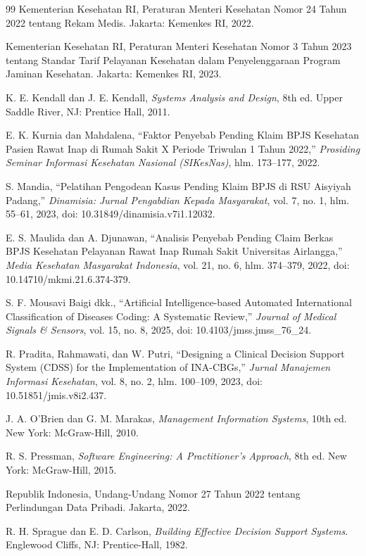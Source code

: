 \begin{thebibliography}{99}
  Kementerian Kesehatan RI, Peraturan Menteri Kesehatan Nomor 24 Tahun 2022 tentang Rekam Medis. Jakarta: Kemenkes RI, 2022.

  Kementerian Kesehatan RI, Peraturan Menteri Kesehatan Nomor 3 Tahun 2023 tentang Standar Tarif Pelayanan Kesehatan dalam Penyelenggaraan Program Jaminan Kesehatan. Jakarta: Kemenkes RI, 2023.

  K. E. Kendall dan J. E. Kendall, \textit{Systems Analysis and Design}, 8th ed. Upper Saddle River, NJ: Prentice Hall, 2011.

  E. K. Kurnia dan Mahdalena, ``Faktor Penyebab Pending Klaim BPJS Kesehatan Pasien Rawat Inap di Rumah Sakit X Periode Triwulan 1 Tahun 2022,'' \textit{Prosiding Seminar Informasi Kesehatan Nasional (SIKesNas)}, hlm. 173--177, 2022.

  S. Mandia, ``Pelatihan Pengodean Kasus Pending Klaim BPJS di RSU Aisyiyah Padang,'' \textit{Dinamisia: Jurnal Pengabdian Kepada Masyarakat}, vol. 7, no. 1, hlm. 55--61, 2023, doi: 10.31849/dinamisia.v7i1.12032.

  E. S. Maulida dan A. Djunawan, ``Analisis Penyebab Pending Claim Berkas BPJS Kesehatan Pelayanan Rawat Inap Rumah Sakit Universitas Airlangga,'' \textit{Media Kesehatan Masyarakat Indonesia}, vol. 21, no. 6, hlm. 374--379, 2022, doi: 10.14710/mkmi.21.6.374-379.

  S. F. Mousavi Baigi dkk., ``Artificial Intelligence-based Automated International Classification of Diseases Coding: A Systematic Review,'' \textit{Journal of Medical Signals \& Sensors}, vol. 15, no. 8, 2025, doi: 10.4103/jmss.jmss\_76\_24.

  R. Pradita, Rahmawati, dan W. Putri, ``Designing a Clinical Decision Support System (CDSS) for the Implementation of INA-CBGs,'' \textit{Jurnal Manajemen Informasi Kesehatan}, vol. 8, no. 2, hlm. 100--109, 2023, doi: 10.51851/jmis.v8i2.437.

  J. A. O'Brien dan G. M. Marakas, \textit{Management Information Systems}, 10th ed. New York: McGraw-Hill, 2010.

  R. S. Pressman, \textit{Software Engineering: A Practitioner's Approach}, 8th ed. New York: McGraw-Hill, 2015.

  Republik Indonesia, Undang-Undang Nomor 27 Tahun 2022 tentang Perlindungan Data Pribadi. Jakarta, 2022.

  R. H. Sprague dan E. D. Carlson, \textit{Building Effective Decision Support Systems}. Englewood Cliffs, NJ: Prentice-Hall, 1982.


\end{thebibliography}
